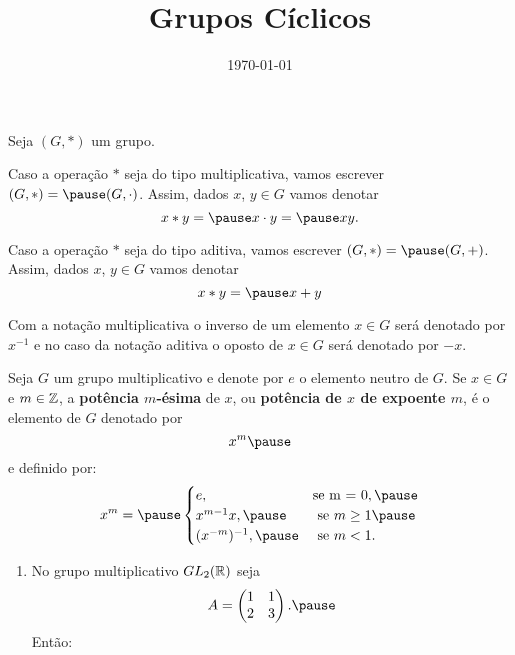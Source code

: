 \documentclass{beamer}
\title{Grupos Cíclicos}
\author[\autor]{\autor}
\institute[\instituto]{\instituto}
\date{\today}
\begin{document}
    \begin{frame}
        \maketitle
    \end{frame}


    \begin{frame}
        Seja $(G, *)$ um grupo. \pause

        Caso a operação $*$ seja do tipo multiplicativa, vamos escrever $(G, *) = \pause (G, \cdot)$. \pause Assim, dados $x$, $y \in G$ vamos denotar\pause
        \[
            x * y = \pause x \cdot y = \pause xy.
        \]

        Caso a operação $*$ seja do tipo aditiva, vamos escrever $(G, *) = \pause (G, +)$. \pause Assim, dados $x$, $y \in G$ vamos denotar\pause
        \[
            x * y = \pause x + y
        \]

        Com a notação multiplicativa \pause o inverso de um elemento $x \in G$ \pause será denotado por $x^{-1}$ \pause e no caso da notação aditiva \pause o oposto de $x \in G$ \pause será denotado por $-x$.
    \end{frame}

    \begin{frame}
        Seja $G$ um grupo multiplicativo \pause e denote por $e$ o elemento neutro de $G$. \pause Se $x \in G$ \pause e $m \in \mathbb{Z}$, \pause a \textbf{potência $m$-ésima} de $x$, \pause ou \textbf{potência de $x$ de expoente $m$}, \pause é o elemento de $G$ denotado por \pause
        \[
            x^m \pause
        \]
        e definido por: \pause
        \[
            x^m = \pause \begin{cases}
                    e, & \mbox{se m = 0}, \pause\\
                    x^{m-1}x, \pause & \mbox{ se } m \ge 1 \pause\\
                    (x^{-m})^{-1}, \pause & \mbox{ se } m < 1. 
                   \end{cases}
        \]
        
    \end{frame}

    \begin{frame}
        \begin{exemplos}
            \begin{enumerate}[label={\arabic*})]
                \item No grupo multiplicativo $GL_2(\mathbb{R})$ \pause seja \pause
                \[
                    A = \begin{pmatrix}
                        1 & 1\\2 & 3
                    \end{pmatrix}. \pause
                \]
                Então: \pause
                \seti
            \end{enumerate}
        \end{exemplos}
    \end{frame}
    
\end{document}
